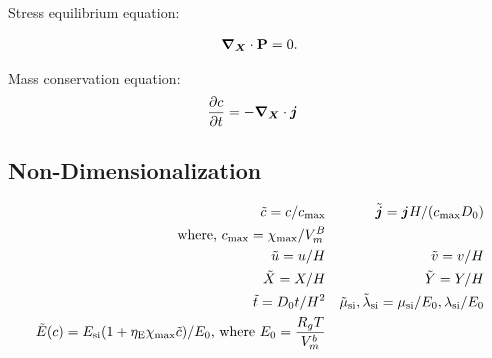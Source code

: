\documentclass[../main.tex]{subfiles}
\begin{document}
Stress equilibrium equation:

\begin{gather}
\bm{\nabla}_{\bm{X}} \cdot \mathbf{P} = 0.
\end{gather}

Mass conservation equation:
\begin{align}
    \frac{\partial c}{\partial t} &= - \bm{\nabla}_{\bm{X}} \cdot \bm{j}
\end{align}

\subsection{Non-Dimensionalization}
\begin{align*}
    \tilde{c} = c/c_{\rm{max}} && \tilde{\bm{j}} = \bm{j} H/({c_{\rm{max}}} D_0) \\ \text{where, } {c_{\rm{max}}} = \chi_{\rm max}/V_m^B \\
    \tilde{u} = u/H && \tilde{v} = v/H \\
    \tilde{X} = X/H && \tilde{Y} = Y/H \\
    \tilde{t} = D_0 t/H^2 && \tilde{\mu}_{\text{si}}, \tilde{\lambda}_{\text{si}} = \mu_{\text{si}}/E_0, \lambda_{\text{si}}/E_0 \\
    \tilde{E}(c) = E_{\text{si}}(1 + \eta_{\rm{E}} \chi_{\rm{max}} \tilde{c})/E_0 \text{, where }  E_0 = \frac{R_g T}{V_m^b} \\
\end{align*}
\end{document}
